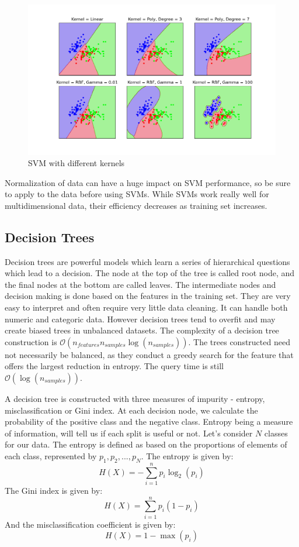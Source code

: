 \documentclass{article}
\newcommand{\code}[1]{{\fontfamily{zi4} \selectfont{#1}}}
\begin{document}
\begin{figure}[H]
\includegraphics[width=\linewidth]{Images/kernel_svm.png}
\centering
\caption{SVM with different kernels}
\end{figure}

Normalization of data can have a huge impact on SVM performance, so be sure to apply \code{MinMaxScaler()} to the data before using SVMs. While SVMs work really well for multidimensional data, their efficiency decreases as training set increases.

\subsection{Decision Trees}

Decision trees are powerful models which learn a series of hierarchical questions which lead to a decision. The node at the top of the tree is called root node, and the final nodes at the bottom are called leaves. The intermediate nodes and decision making is done based on the features in the training set. They are very easy to interpret and often require very little data cleaning. It can handle both numeric and categoric data. However decision trees tend to overfit and may create biased trees in unbalanced datasets. The complexity of a decision tree construction is $\mathcal{O}(n_{features} n_{samples} \log(n_{samples}))$. The trees constructed need not necessarily be balanced, as they conduct a greedy search for the feature that offers the largest reduction in entropy. The query time is still $\mathcal{O}(\log(n_{samples}))$. 

A decision tree is constructed with three measures of impurity - entropy, misclassification or Gini index. At each decision node, we calculate the probability of the positive class and the negative class. Entropy being a measure of information, will tell us if each split is useful or not. Let's consider $N$ classes for our data. The entropy is defined as based on the proportions of elements of each class, represented by $p_1, p_2, ..., p_N$.
The entropy is given by:
$$H(X) = - \sum_{i=1}^n p_i \log_2 (p_i)$$
The Gini index is given by:
$$H(X) = \sum_{i=1}^n p_i (1-p_i)$$
And the misclassification coefficient is given by:
$$H(X) = 1 - \max(p_i)$$
\end{document}
